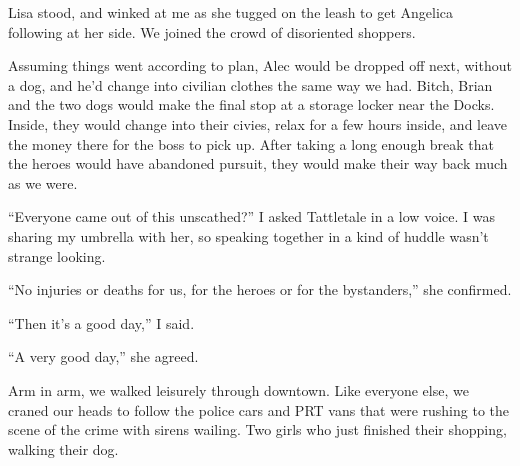 Lisa stood, and winked at me as she tugged on the leash to get Angelica following at her side.  We joined the crowd of disoriented shoppers.



Assuming things went according to plan, Alec would be dropped off next, without a dog, and he'd change into civilian clothes the same way we had.  Bitch, Brian and the two dogs would make the final stop at a storage locker near the Docks.  Inside, they would change into their civies, relax for a few hours inside, and leave the money there for the boss to pick up.  After taking a long enough break that the heroes would have abandoned pursuit, they would make their way back much as we were.



``Everyone came out of this unscathed?'' I asked Tattletale in a low voice.  I was sharing my umbrella with her, so speaking together in a kind of huddle wasn't strange looking.



``No injuries or deaths for us, for the heroes or for the bystanders,'' she confirmed.



``Then it's a good day,'' I said.



``A very good day,'' she agreed.



Arm in arm, we walked leisurely through downtown.  Like everyone else, we craned our heads to follow the police cars and PRT vans that were rushing to the scene of the crime with sirens wailing.  Two girls who just finished their shopping, walking their dog.





